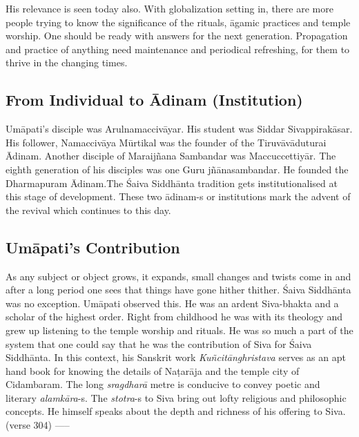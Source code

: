 His relevance is seen today also. With globalization setting in, there are more people trying to know the significance of the rituals, āgamic practices and temple worship. One should be ready with answers for the next generation. Propagation and practice of anything need maintenance and periodical refreshing, for them to thrive in the changing times.


\subsection*{From Individual to Ādinam (Institution)}

Umāpati’s disciple was Arulnamaccivāyar. His student was Siddar Sivappirakāsar. His follower, Namaccivāya Mūrtikal was the founder of the Tiruvāvāduturai Ādinam. Another disciple of Maraijñana Sambandar was Maccuccettiyār. The eighth generation of his disciples was one Guru jñānasambandar. He founded the Dharmapuram Ādinam.The Śaiva Siddhānta tradition gets institutionalised at this stage of development. These two ādinam-s or institutions mark the advent of the revival which continues to this day.


\subsection*{Umāpati's Contribution}

As any subject or object grows, it expands, small changes and twists come in and after a long period one sees that things have gone hither thither. Śaiva Siddhānta was no exception. Umāpati observed this. He was an ardent Siva-bhakta and a scholar of the highest order. Right from childhood he was with its theology and grew up listening to the temple worship and rituals. He was so much a part of the system that one could say that he was the contribution of Siva for Śaiva Siddhānta. In this context, his Sanskrit work \textit{Kuñcitānghristava} serves as an apt hand book for knowing the details of Naṭarāja and the temple city of Cidambaram. The long \textit{sragdharā} metre is conducive to convey poetic and literary \textit{alamkāra}-s. The \textit{stotra}-s to Siva bring out lofty religious and philosophic concepts. He himself speaks about the depth and richness of his offering to Siva. (verse 304) -----

